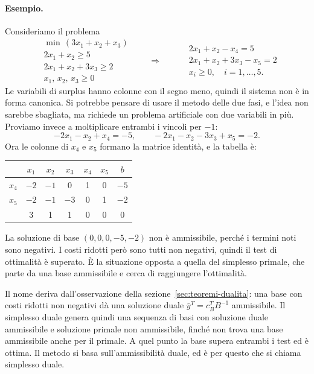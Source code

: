 \paragraph{Esempio.}
Consideriamo il problema
\[
\begin{aligned}
&\min\, (3x_1 + x_2 + x_3) \\
&2x_1 + x_2 \ge 5 \\
&2x_1 + x_2 + 3x_3 \ge 2 \\
&x_1,\, x_2,\, x_3 \ge 0
\end{aligned}
\qquad\Longrightarrow\qquad
\begin{aligned}
&2x_1 + x_2 - x_4 = 5 \\
&2x_1 + x_2 + 3x_3 - x_5 = 2 \\
&x_i \ge 0, \quad i = 1, \dots, 5.
\end{aligned}
\]
Le variabili di surplus hanno colonne con il segno meno, quindi il sistema non è in forma canonica. Si potrebbe pensare di usare il metodo delle due fasi, e l'idea non sarebbe sbagliata, ma richiede un problema artificiale con due variabili in più. Proviamo invece a moltiplicare entrambi i vincoli per $-1$:
\[
-2x_1 - x_2 + x_4 = -5, \qquad -2x_1 - x_2 - 3x_3 + x_5 = -2.
\]
Ora le colonne di $x_4$ e $x_5$ formano la matrice identità, e la tabella è:
\begin{center}
\begin{tabular}{c|ccccc|c}
 & $x_1$ & $x_2$ & $x_3$ & $x_4$ & $x_5$ & $b$ \\
\hline
$x_4$ & $-2$ & $\boxed{-1}$ & 0 & 1 & 0 & $-5$ \\
$x_5$ & $-2$ & $-1$ & $-3$ & 0 & 1 & $-2$ \\
\hline
 & 3 & 1 & 1 & 0 & 0 & 0 \\
\end{tabular}
\end{center}
La soluzione di base $(0, 0, 0, -5, -2)$ non è ammissibile, perché i termini noti sono negativi. I costi ridotti però sono tutti non negativi, quindi il test di ottimalità è superato. È la situazione opposta a quella del simplesso primale, che parte da una base ammissibile e cerca di raggiungere l'ottimalità.

Il nome deriva dall'osservazione della sezione~\ref{sec:teoremi-dualita}: una base con costi ridotti non negativi dà una soluzione duale $\bar{y}^T = c_B^T B^{-1}$ ammissibile. Il simplesso duale genera quindi una sequenza di basi con soluzione duale ammissibile e soluzione primale non ammissibile, finché non trova una base ammissibile anche per il primale. A quel punto la base supera entrambi i test ed è ottima. Il metodo si basa sull'ammissibilità duale, ed è per questo che si chiama simplesso duale.

